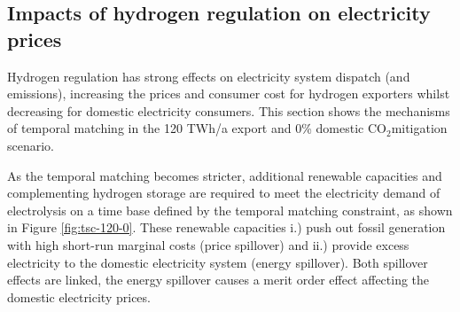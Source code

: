 \documentclass[5p,numafflabel]{elsarticle}
\newcommand{\co}{\ce{CO2}~}
\def\co{CO${}_2${\:}}
\begin{document}





\subsection*{Impacts of hydrogen regulation on electricity prices}
\label{subsec:benefits_rule}

Hydrogen regulation has strong effects on electricity system dispatch (and emissions), increasing the prices and consumer cost for hydrogen exporters whilst decreasing for domestic electricity consumers. This section shows the mechanisms of temporal matching in the 120 TWh/a export and 0\% domestic \co mitigation scenario.

As the temporal matching becomes stricter, additional renewable capacities and complementing hydrogen storage are required to meet the electricity demand of electrolysis
on a time base defined by the temporal matching constraint, as shown in Figure \ref{fig:tsc-120-0}. These renewable capacities i.) push out fossil generation with high short-run marginal costs (price spillover) and ii.) provide excess electricity to the domestic electricity system (energy spillover). Both spillover effects are linked, the energy spillover causes a merit order effect affecting the domestic electricity prices.
\end{document}
